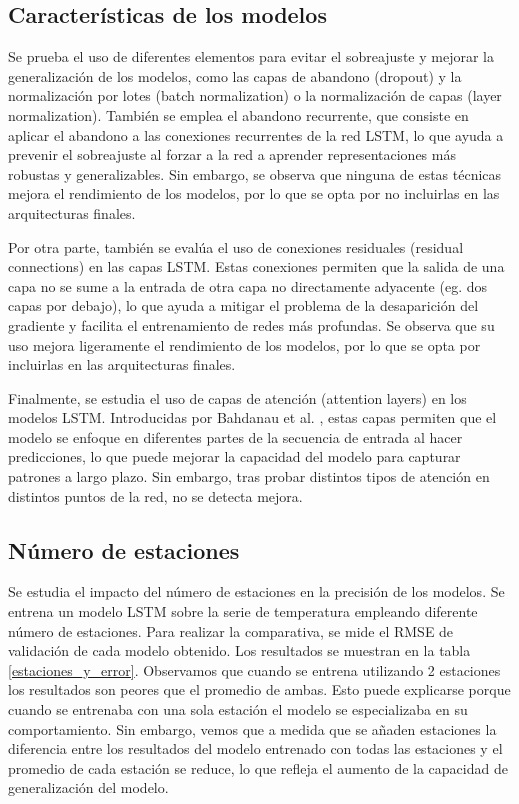 \subsection{Características de los modelos}
Se prueba el uso de diferentes elementos para evitar el sobreajuste y mejorar la generalización de los modelos, como las capas de abandono (dropout) y la normalización 
por lotes (batch normalization) o la normalización de capas (layer normalization). También se emplea el abandono recurrente, que consiste en aplicar el abandono a las conexiones recurrentes de la red LSTM, lo que ayuda a prevenir el sobreajuste al forzar a la red a aprender representaciones más robustas y generalizables.
Sin embargo, se observa que ninguna de estas técnicas mejora el rendimiento de los modelos, por lo que se opta por no incluirlas en las arquitecturas finales.

Por otra parte, también se evalúa el uso de conexiones residuales (residual connections) en las capas LSTM. Estas conexiones permiten que la salida de una capa no se sume a la
 entrada de otra capa no directamente adyacente (eg. dos capas por debajo), lo que ayuda a mitigar el problema de la desaparición del gradiente y facilita el entrenamiento de redes más profundas.
Se observa que su uso mejora ligeramente el rendimiento de los modelos, por lo que se opta por incluirlas en las arquitecturas finales.

Finalmente, se estudia el uso de capas de atención (attention layers) en los modelos LSTM. Introducidas por Bahdanau et al. \cite{bahdanau2014}, estas capas permiten que el modelo se enfoque en diferentes partes de la secuencia de entrada al hacer predicciones, lo que puede mejorar la capacidad del modelo para capturar patrones a largo plazo.
Sin embargo, tras probar distintos tipos de atención en distintos puntos de la red, no se detecta mejora.

\subsection{Número de estaciones}
Se estudia el impacto del número de estaciones en la precisión de los modelos. Se entrena un modelo LSTM sobre la serie de temperatura empleando diferente número de estaciones.
Para realizar la comparativa, se mide el RMSE de validación de cada modelo obtenido. Los resultados se muestran en la tabla \ref{estaciones_y_error}. Observamos que cuando se entrena utilizando 2 estaciones los resultados son peores que el promedio de ambas.
Esto puede explicarse porque cuando se entrenaba con una sola estación el modelo se especializaba en su comportamiento. Sin embargo, vemos que a medida que se añaden estaciones la 
diferencia entre los resultados del modelo entrenado con todas las estaciones y el promedio de cada estación se reduce, lo que refleja el aumento de la capacidad de generalización del modelo.

